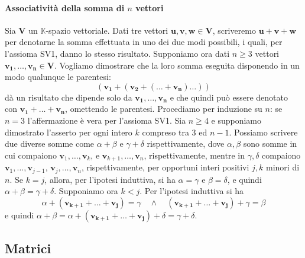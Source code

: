 \documentclass{article}
\theoremstyle{plain}
\theoremstyle{definition}
\theoremstyle{remark}
\begin{document}
\vspace{10pt}

\paragraph{Associatività della somma di $n$ vettori}
Sia \( \mathbf{V} \) un \( \mathbb{K} \)-spazio vettoriale. Dati tre vettori \( \mathbf{u}, \mathbf{v}, \mathbf{w} \in \mathbf{V} \), scriveremo \( \mathbf{u} + \mathbf{v} + \mathbf{w} \) per denotarne la somma effettuata in uno dei due modi possibili, i quali, per l'assioma SV1, danno lo stesso risultato.
Supponiamo ora dati \( n \geq 3 \) vettori \( \mathbf{v_1}, \ldots, \mathbf{v_n} \in \mathbf{V} \). 
Vogliamo dimostrare che la loro somma eseguita disponendo in un modo qualunque le parentesi:
\[ (\mathbf{v_1} + (\mathbf{v_2} + ( \ldots + \mathbf{v_n}) \ldots ))\]
dà un risultato che dipende solo da \( \mathbf{v_1}, \ldots, \mathbf{v_n} \) e che quindi può essere denotato con \( \mathbf{v_1} + \ldots + \mathbf{v_n} \), omettendo le parentesi.
Procediamo per induzione su \( n \): se \( n = 3 \) l'affermazione è vera per l'assioma SV1.
Sia \( n \geq 4 \) e supponiamo dimostrato l'asserto per ogni intero \( k \) compreso tra $3$ ed \( n - 1 \).
Possiamo scrivere due diverse somme come \( \alpha + \beta \) e \( \gamma + \delta \) rispettivamente, dove \( \alpha, \beta \) sono somme in cui compaiono \( \mathbf{v}_1, \ldots, \mathbf{v}_k \), e \( \mathbf{v}_{k+1}, \ldots, \mathbf{v}_n \), rispettivamente, mentre in \( \gamma, \delta \) compaiono \( \mathbf{v}_1, \ldots, \mathbf{v}_{j-1} \), \( \mathbf{v}_j, \ldots, \mathbf{v}_n \), rispettivamente, per opportuni interi positivi \( j, k \) minori di \( n \).
Se \( k = j \), allora, per l'ipotesi induttiva, si ha \( \alpha = \gamma \) e \( \beta = \delta \), e quindi \( \alpha + \beta = \gamma + \delta \).
Supponiamo ora \( k < j \). Per l'ipotesi induttiva si ha
\[ \alpha + (\mathbf{v_{k+1}} + \ldots + \mathbf{v_j}) = \gamma\quad\land\quad (\mathbf{v_{k+1}} + \ldots + \mathbf{v_j}) +\gamma = \beta \]
e quindi 
\( \alpha + \beta = \alpha + (\mathbf{v_{k+1}} + \ldots + \mathbf{v_j}) + \delta = \gamma + \delta \).

\newpage
\subsection{Matrici}
\vspace{20pt}
\end{document}
